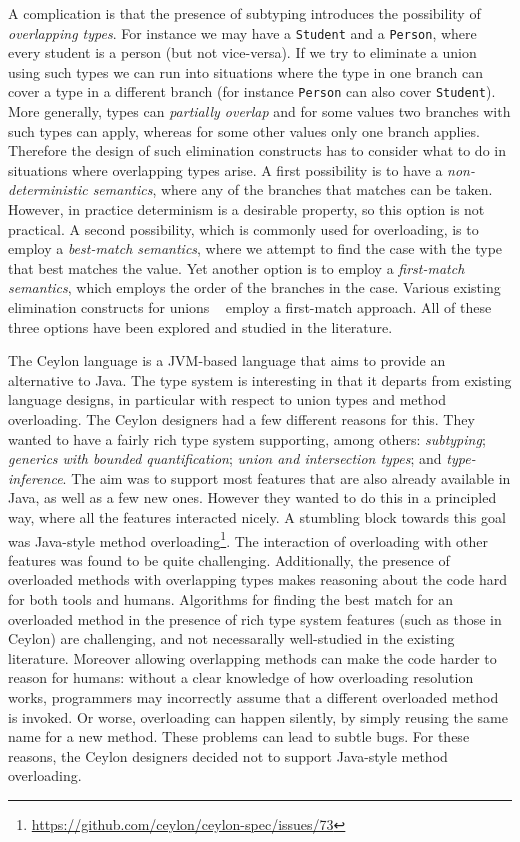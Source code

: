 A complication is that the presence of subtyping introduces the
possibility of \emph{overlapping types}. For instance we may have a
\lstinline{Student} and a \lstinline{Person}, where every student is a person (but not
vice-versa). If we try to eliminate a union using such types we can
run into situations where the type in one branch can cover a type in a
different branch (for instance \lstinline{Person} can also cover
\lstinline{Student}). More generally, types can \emph{partially overlap}
and for some values two branches with such types can apply, whereas
for some other values only one branch applies.
Therefore the design of such elimination constructs has to
consider what to do in situations where overlapping types arise.  A
first possibility is to have a \emph{non-deterministic semantics},
where any of the branches that matches can be taken. However, in
practice determinism is a desirable property,
so this option is not practical. A second possibility, which is
commonly used for overloading, is to employ a \emph{best-match
  semantics}, where we attempt to find the case with the type that
best matches the value. Yet another option is to employ a
\emph{first-match semantics}, which employs the order of the branches
in the case. Various existing elimination constructs for unions
~\cite{benzaken2003cduce,castagna:settheoretic}
employ a first-match approach. All of these three options have been explored
and studied in the literature. 

The Ceylon language is a JVM-based language that aims to provide an
alternative to Java. The type system is interesting
in that it departs from existing language designs, in particular
with respect to union types and method overloading.
The Ceylon designers had a few different
reasons for this. They wanted to have a fairly rich type system
supporting, among others: \emph{subtyping}; \emph{generics with bounded
quantification}; \emph{union and intersection types}; and \emph{type-inference}.
The aim was to support most features that are also already available
in Java, as well as a few new ones. However they wanted to do this in
a principled way, where all the features interacted nicely.  A
stumbling block towards this goal was Java-style method
overloading\footnote{\url{https://github.com/ceylon/ceylon-spec/issues/73}}.
The interaction of overloading with other
features was found to be quite challenging. Additionally, the presence of
overloaded methods with overlapping types
makes reasoning about the code hard 
for both tools and humans. Algorithms for finding the best match for an
overloaded method in the presence of rich type system features (such as
those in Ceylon) are challenging, and not necessarally well-studied in the
existing literature. Moreover allowing overlapping methods can make
the code harder to reason for humans: without a clear knowledge of how
overloading resolution works, programmers may incorrectly assume that
a different overloaded method is invoked. Or worse, overloading can
happen silently, by simply reusing the same name for a new
method. These problems can lead to subtle bugs.
For these reasons, the Ceylon designers decided not to support
Java-style method overloading.

